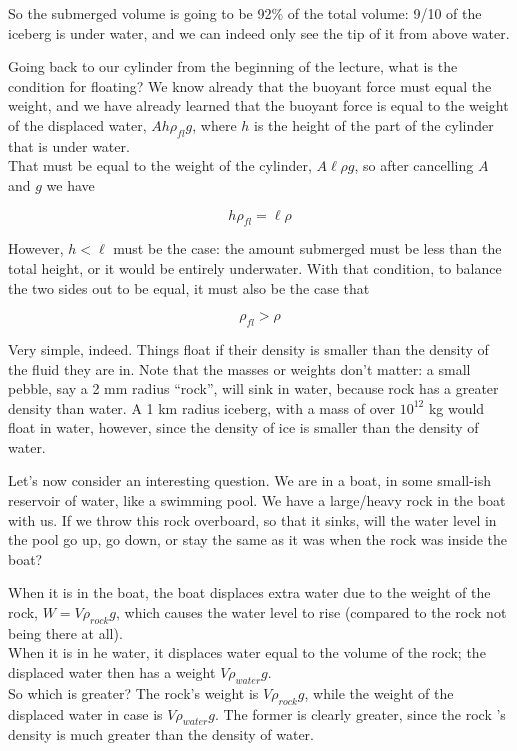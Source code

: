 So the submerged volume is going to be 92\% of the total volume: 9/10 of the iceberg is under water, and we can indeed only see the tip of it from above water.

Going back to our cylinder from the beginning of the lecture, what is the condition for floating? We know already that the buoyant force must equal the weight, and we have already learned that the buoyant force is equal to the weight of the displaced water, $A h \rho_{fl} g$, where $h$ is the height of the part of the cylinder that is under water.\\
That must be equal to the weight of the cylinder, $A \ell \rho g$, so after cancelling $A$ and $g$ we have

\begin{equation}
h \rho_{fl} = \ell \rho
\end{equation}

However, $h < \ell$ must be the case: the amount submerged must be less than the total height, or it would be entirely underwater. With that condition, to balance the two sides out to be equal, it must also be the case that

\begin{equation}
\rho_{fl} > \rho
\end{equation}

Very simple, indeed. Things float if their density is smaller than the density of the fluid they are in. Note that the masses or weights don't matter: a small pebble, say a 2 mm radius ``rock'', will sink in water, because rock has a greater density than water. A 1 km radius iceberg, with a mass of over $10^{12}$ kg would float in water, however, since the density of ice is smaller than the density of water.

Let's now consider an interesting question. We are in a boat, in some small-ish reservoir of water, like a swimming pool. We have a large/heavy rock in the boat with us. If we throw this rock overboard, so that it sinks, will the water level in the pool go up, go down, or stay the same as it was when the rock was inside the boat?

When it is in the boat, the boat displaces extra water due to the weight of the rock, $W = V \rho_{rock} g$, which causes the water level to rise (compared to the rock not being there at all).\\
When it is in he water, it displaces water equal to the volume of the rock; the displaced water then has a weight $V \rho_{water} g$.\\
So which is greater? The rock's weight is $V \rho_{rock} g$, while the weight of the displaced water in case is $V \rho_{water} g$. The former is clearly greater, since the rock 's density is much greater than the density of water.

